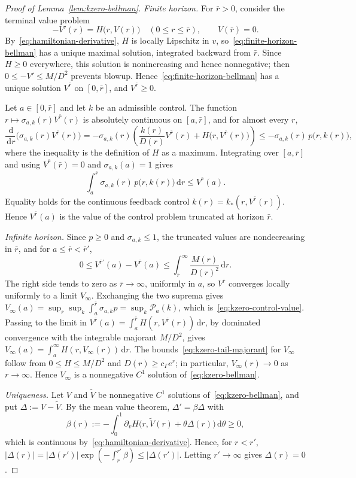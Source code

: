 \documentclass[11pt]{article}
\theoremstyle{definition}
\theoremstyle{remark}
\newcommand{\dd}{\,\mathrm d}
\begin{document}
\begin{proof}[Proof of Lemma~\ref{lem:kzero-bellman}]
\emph{Finite horizon.}
For $\bar r>0$, consider the terminal value problem
\begin{equation}\label{eq:finite-horizon-bellman}
 -V'(r)=H\bigl(r,V(r)\bigr)\quad(0\le r\le\bar r),
 \qquad V(\bar r)=0.
\end{equation}
By~\eqref{eq:hamiltonian-derivative}, $H$ is locally Lipschitz in $v$, so~\eqref{eq:finite-horizon-bellman} has a unique maximal solution, integrated backward from $\bar r$.
Since $H\ge0$ everywhere, this solution is nonincreasing and hence nonnegative; then $0\le-V'\le M/D^2$ prevents blowup.
Hence~\eqref{eq:finite-horizon-bellman} has a unique solution $V^{\bar r}$ on $[0,\bar r]$, and $V^{\bar r}\ge0$.

Let $a\in[0,\bar r]$ and let $k$ be an admissible control.
The function $r\mapsto\sigma_{a,k}(r)V^{\bar r}(r)$ is absolutely continuous on $[a,\bar r]$, and for almost every $r$,
\[
 \frac{\dd}{\dd r}\bigl(\sigma_{a,k}(r)V^{\bar r}(r)\bigr)
 =-\sigma_{a,k}(r)\left(\frac{k(r)}{D(r)}V^{\bar r}(r)+H\bigl(r,V^{\bar r}(r)\bigr)\right)
 \le-\sigma_{a,k}(r)\,p\bigl(r,k(r)\bigr),
\]
where the inequality is the definition of $H$ as a maximum.
Integrating over $[a,\bar r]$ and using $V^{\bar r}(\bar r)=0$ and $\sigma_{a,k}(a)=1$ gives
\[
 \int_a^{\bar r}\sigma_{a,k}(r)\,p\bigl(r,k(r)\bigr)\dd r\le V^{\bar r}(a).
\]
Equality holds for the continuous feedback control $k(r)=k_*(r,V^{\bar r}(r))$.
Hence $V^{\bar r}(a)$ is the value of the control problem truncated at horizon $\bar r$.

\emph{Infinite horizon.}
Since $p\ge0$ and $\sigma_{a,k}\le1$, the truncated values are nondecreasing in $\bar r$, and for $a\le\bar r<\bar r'$,
\[
 0\le V^{\bar r'}(a)-V^{\bar r}(a)\le\int_{\bar r}^\infty\frac{M(r)}{D(r)^2}\dd r.
\]
The right side tends to zero as $\bar r\to\infty$, uniformly in $a$, so $V^{\bar r}$ converges locally uniformly to a limit $V_\infty$.
Exchanging the two suprema gives $V_\infty(a)=\sup_{\bar r}\sup_k\int_a^{\bar r}\sigma_{a,k}p=\sup_k\mathcal P_a(k)$, which is~\eqref{eq:kzero-control-value}.
Passing to the limit in $V^{\bar r}(a)=\int_a^{\bar r}H(r,V^{\bar r}(r))\dd r$, by dominated convergence with the integrable majorant $M/D^2$, gives $V_\infty(a)=\int_a^\infty H(r,V_\infty(r))\dd r$.
The bounds~\eqref{eq:kzero-tail-majorant} for $V_\infty$ follow from $0\le H\le M/D^2$ and $D(r)\ge c_\Gamma e^r$; in particular, $V_\infty(r)\to0$ as $r\to\infty$.
Hence $V_\infty$ is a nonnegative $C^1$ solution of~\eqref{eq:kzero-bellman}.

\emph{Uniqueness.}
Let $V$ and $\widetilde V$ be nonnegative $C^1$ solutions of~\eqref{eq:kzero-bellman}, and put $\Delta:=V-\widetilde V$.
By the mean value theorem, $\Delta'=\beta\Delta$ with
\[
 \beta(r):=-\int_0^1\partial_vH\bigl(r,\widetilde V(r)+\theta\Delta(r)\bigr)\dd\theta\ge0,
\]
which is continuous by~\eqref{eq:hamiltonian-derivative}.
Hence, for $r<r'$, $|\Delta(r)|=|\Delta(r')|\exp(-\int_r^{r'}\beta)\le|\Delta(r')|$.
Letting $r'\to\infty$ gives $\Delta(r)=0$.
\end{proof}
\end{document}
